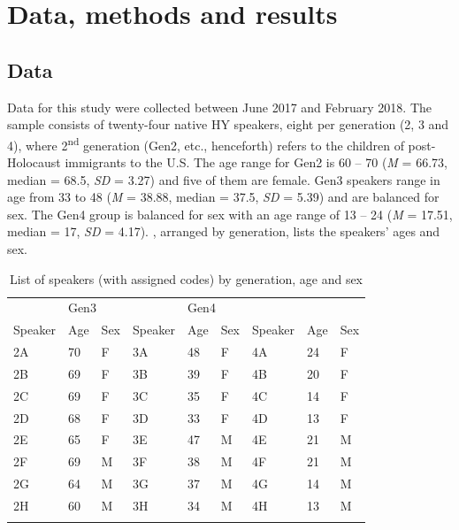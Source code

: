 \documentclass[output=paper]{langsci/langscibook}
\begin{document}
\section{Data, methods and results}
\label{sec:nove:4}


 
\subsection{Data}
\label{sec:nove:4.1}


Data for this study were collected between June 2017 and February 2018. The sample consists of twenty-four native HY speakers, eight per generation (2, 3 and 4), where 2\textsuperscript{nd} generation (Gen2, etc., henceforth) refers to the children of post-Holocaust immigrants to the U.S. The age range for Gen2 is 60 – 70 (\textit{M} = 66.73, median = 68.5, \textit{SD} = 3.27) and five of them are female. Gen3 speakers range in age from 33 to 48 (\textit{M} = 38.88, median = 37.5, \textit{SD} = 5.39) and are balanced for sex. The Gen4 group is balanced for sex with an age range of 13 – 24 (\textit{M} = 17.51, median = 17, \textit{SD} = 4.17).  , arranged by generation, lists the speakers’ ages and sex. 


\begin{table}
	\begin{tabularx}{\textwidth}{XXXXXXXXX}
	\lsptoprule
	\multicolumn{3}{X}{{Gen2}} & \multicolumn{3}{X}{{Gen3}} & \multicolumn{3}{X}{{Gen4}}\\
	{Speaker} & {Age} & Sex & {Speaker} & {Age} & Sex & {Speaker} & {Age} & Sex\\
	\hline
	 2A & 70 & F & 3A & 48 & F & 4A & 24 & F\\
	 2B & 69 & F & 3B & 39 & F & 4B & 20 & F\\
 	2C & 69 & F & 3C & 35 & F & 4C & 14 & F\\
 	2D & 68 & F & 3D & 33 & F & 4D & 13 & F\\
 	2E & 65 & F & 3E & 47 & M & 4E & 21 & M\\
 	2F & 69 & M & 3F & 38 & M & 4F & 21 & M\\
 	2G & 64 & M & 3G & 37 & M & 4G & 14 & M\\
 	2H & 60 & M & 3H & 34 & M & 4H & 13 & M\\
	\lspbottomrule
	\end{tabularx}
	\caption{List of speakers (with assigned codes) by generation, age and sex}\label{tab:nove:1}
\end{table}
\end{document}
